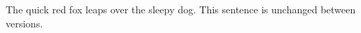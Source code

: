 \documentclass{article}
\begin{document}
The quick red fox leaps over the sleepy dog.
This sentence is unchanged between versions.
\end{document}
